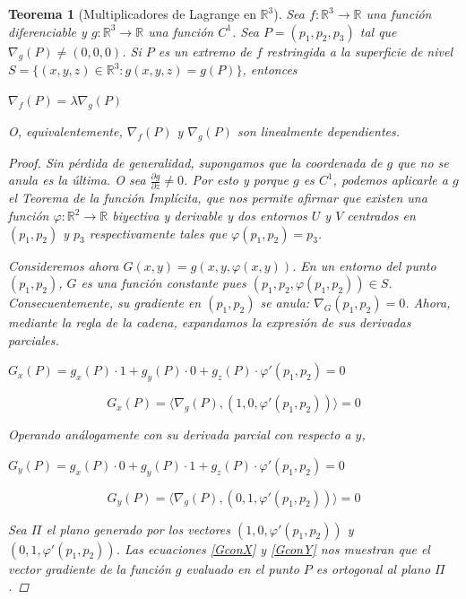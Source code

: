 \documentclass[]{article}
\newtheorem{teo}{Teorema}
\def\R{\mathbb{R}}
\newcommand{\ip}[2]{\langle #1,#2 \rangle}
\newcommand{\dprim}[2]{\frac{\partial #1}{\partial #2}}
\begin{document}
\begin{teo}[Multiplicadores de Lagrange en $\R^3$]
	Sea $f:\R^3\to\R$ una función diferenciable y $g:\R^3\to\R$ una función $C^1$. Sea $P=(p_1,p_2,p_3)$ tal que $\nabla_g(P)\neq(0,0,0)$. Si $P$ es un extremo de $f$ restringida a la superficie de nivel $S=\{(x,y,z)\in\R^3:g(x,y,z)=g(P)\}$, entonces
	\begin{center}
		$\nabla_f(P) = \lambda\nabla_g(P)$
	\end{center}
	O, equivalentemente, $\nabla_f(P)$ y $\nabla_g(P)$ son linealmente dependientes.
	\begin{proof}
		Sin pérdida de generalidad, supongamos que la coordenada de $g$ que no se anula es la última. O sea $\dprim{g}{z}\neq 0$. Por esto y porque $g$ es $C^1$, podemos aplicarle a $g$ el Teorema de la función Implícita, que nos permite afirmar que existen una función $\varphi:\R^2\to\R$ biyectiva y derivable y dos entornos $U$ y $V$ centrados en $(p_1,p_2)$ y $p_3$ respectivamente tales que $\varphi(p_1,p_2)=p_3$.
		
		Consideremos ahora $G(x,y) = g(x,y,\varphi(x,y))$. En un entorno del punto $(p_1,p_2)$, $G$ es una función constante pues $(p_1,p_2,\varphi(p_1,p_2))\in S$. Consecuentemente, su gradiente en $(p_1,p_2)$ se anula: $\nabla_G(p_1,p_2) = 0$. Ahora, mediante la regla de la cadena, expandamos la expresión de sus derivadas parciales.
		\begin{center}
			$G_x(P) = g_x(P)\cdot 1 + g_y(P)\cdot 0 + g_z(P)\cdot\varphi'(p_1,p_2)=0$
		\end{center}
		\begin{equation}\label{GconX}
			G_x(P) = \ip{\nabla_g(P)}{(1,0,\varphi'(p_1,p_2))}=0
		\end{equation}
		
		Operando análogamente con su derivada parcial con respecto a $y$,
		\begin{center}
			$G_y(P) = g_x(P)\cdot 0 + g_y(P)\cdot 1 + g_z(P)\cdot\varphi'(p_1,p_2)=0$
		\end{center}
		\begin{equation}\label{GconY}
			G_y(P) = \ip{\nabla_g(P)}{(0,1,\varphi'(p_1,p_2))}=0
		\end{equation}
		
		Sea $\Pi$ el plano generado por los vectores $(1,0,\varphi'(p_1,p_2))$ y $(0,1,\varphi'(p_1,p_2))$.	Las ecuaciones \eqref{GconX} y \eqref{GconY} nos muestran que el vector gradiente de la función $g$ evaluado en el punto $P$ es ortogonal al plano $\Pi$.
		

\end{proof}
\end{teo}
\end{document}
